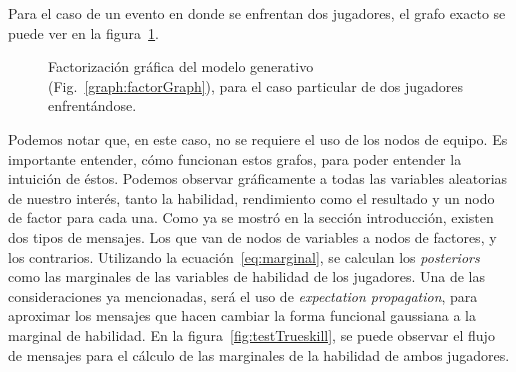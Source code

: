 \documentclass[11pt,twoside,spanish]{report} %
\begin{document}
Para el caso de un evento en donde se enfrentan dos jugadores, el grafo exacto se puede ver en la figura~\ref{fig:ejfig1vs1}.

\begin{figure}[H]
	\centering
\caption{ Factorizaci\'on gr\'afica del modelo generativo (Fig.~\ref{graph:factorGraph}), para el caso particular de dos jugadores enfrent\'andose.}
\label{fig:ejfig1vs1}
\end{figure}


Podemos notar que, en este caso, no se requiere el uso de los nodos de equipo.
Es importante entender, c\'omo funcionan estos grafos, para poder entender la intuici\'on de \'estos.
Podemos observar gr\'aficamente a todas las variables aleatorias de nuestro inter\'es, tanto la habilidad, rendimiento como el resultado y un nodo de factor para cada una.
Como ya se mostr\'o en la secci\'on introducci\'on, existen dos tipos de mensajes.
Los que van de nodos de variables a nodos de factores, y los contrarios.
Utilizando la ecuaci\'on~\ref{eq:marginal}, se calculan los \textit{posteriors} como las marginales de las variables de habilidad de los jugadores. 
Una de las consideraciones ya mencionadas, ser\'a el uso de \textit{expectation propagation}, para aproximar los mensajes que hacen cambiar la forma funcional gaussiana a la marginal de habilidad.
En la figura~\ref{fig:testTrueskill}, se puede observar el flujo de mensajes para el c\'alculo de las marginales de la habilidad de ambos jugadores. 
\end{document}
